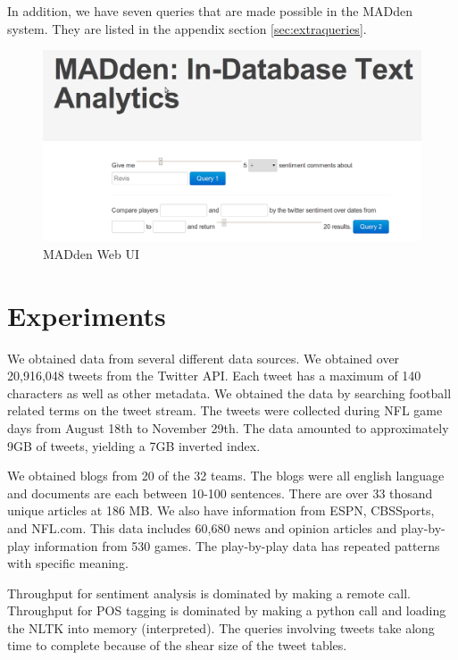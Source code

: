 \documentclass[11pt,onecolumn]{article}
\newcommand{\system}{MADden\xspace}
\begin{document}
	
	In addition, we have seven queries that are made possible in the \system system. They are listed in the appendix section \ref{sec:extraqueries}.

  \begin{figure}
    \begin{center}
      \includegraphics[scale=0.3]{web-ui.png}
      \caption{{\system} Web UI}
      \label{fig:web-ui}
    \end{center}
  \end{figure}

  \section{Experiments}

		We obtained data from several different data sources.
		We obtained over 20,916,048 tweets from the Twitter API.
Each tweet has a maximum of 140 characters as well as other metadata.
We obtained the data by searching football related terms on the tweet stream.
The tweets were collected during NFL game days from August 18th to
November 29th. The data amounted to 
approximately 9GB of tweets, yielding a 7GB inverted index.

We obtained blogs from 20 of the 32 teams. The blogs were all english
language and documents are each between 10-100 sentences.
There are over 33 thosand unique articles at 186 MB. 
We also have information from ESPN, CBSSports, and NFL.com. This data includes
60,680 news and opinion articles and play-by-play information from 530 games.
The play-by-play data has repeated patterns with specific meaning.

    Throughput for sentiment analysis is dominated by making a remote call.
    Throughput for POS tagging is dominated by making a python call and 
loading the NLTK into memory (interpreted).
The queries involving tweets take along time to complete because of the shear
size of the tweet tables.
\end{document}

